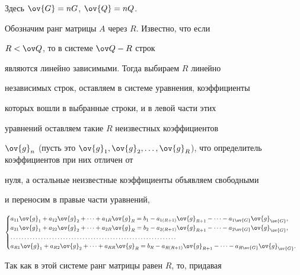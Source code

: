 \begin{pf}
Здесь $\ov{G}=nG$, $\ov{Q}=nQ$.





Обозначим ранг матрицы $A$ через $R$. Известно, что если


$R<\ov Q$, то в системе $ \ov Q-R$ строк


являются линейно зависимыми. Тогда выбираем $R$ линейно


независимых строк, оставляем в системе уравнения, коэффициенты


которых вошли в выбранные строки, и в левой части этих


уравнений оставляем такие $R$ неизвестных коэффициентов


$\ov{g}_n$ (пусть это $\ov{g}_1,\ov{g}_2,\dotsc,


\ov{g}_R$), что определитель коэффициентов при них отличен от


нуля, а остальные неизвестные коэффициенты объявляем свободными


и переносим в правые части уравнений,


\begin{equation}


\begin{cases}


a_{11}\ov{g}_1+a_{12}\ov{g}_2+\dotsb+ a_{1R}\ov{g}_R= b_1-


a_{1(R+1)}\ov{g}_{R+1}-\dotsb - a_{1\ov{G}}\ov{g}_{\ov{G}},\\


a_{21}\ov{g}_1+a_{22}\ov{g}_2+\dotsb+ a_{2R}\ov{g}_R= b_2-


a_{2(R+1)}\ov{g}_{R+1}-\dotsb - a_{2\ov{G}}\ov{g}_{\ov{G}},\\


\dotsc\dotsc\dotsc\dotsc\dotsc\dotsc\dotsc\dotsc\dotsc\dotsc


\dotsc\dotsc\dotsc\dotsc\dotsc\dotsc\dotsc\dotsc\dotsc\dotsc\\


a_{R1}\ov{g}_1+a_{R2}\ov{g}_2+\dotsb+ a_{RR}\ov{g}_R= b_R-


a_{R(R+1)}\ov{g}_{R+1}-\dotsb - a_{R\ov{G}}\ov{g}_{\ov{G}}.


\end{cases}


\end{equation}





Так как в этой системе ранг матрицы равен $R$, то, придавая



\end{pf}
